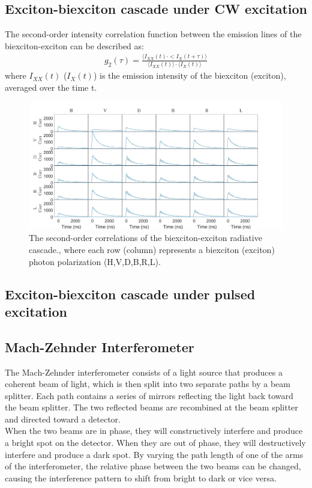 \subsection{Exciton-biexciton cascade under CW excitation}
The second-order intensity correlation function between the emission lines of the biexciton-exciton can be described as:
\begin{equation} \label{second_order_correlations}
\begin{aligned} 
        g_2(\tau) = \frac{\langle I_{XX}(t) \cdot<I_{X}(t+\tau) \rangle}{\langle I_{XX}(t)\rangle \cdot\langle I_{X}(t)\rangle}
\end{aligned}
\end{equation}
where $I_{XX}(t)$ ($I_X(t)$) is the emission intensity of the biexciton (exciton), averaged over the time t.
\begin{figure}[H]
	\centering
	\includegraphics[scale=0.24]{figures/XX_X_Correlations.jpg}
	\caption{ The second-order correlations of the biexciton-exciton radiative cascade., where each row (column) represents a biexciton (exciton) photon polarization (H,V,D,B,R,L).}
	\label{fig:XX_X_Correlations}
\end{figure}
\subsection{Exciton-biexciton cascade under pulsed excitation}
\subsection{Mach-Zehnder Interferometer}
The Mach-Zehnder interferometer consists of a light source that produces a coherent beam of light, which is then split into two separate paths by a beam splitter. Each path contains a series of mirrors reflecting the light back toward the beam splitter. The two reflected beams are recombined at the beam splitter and directed toward a detector.\\
When the two beams are in phase, they will constructively interfere and produce a bright spot on the detector. When they are out of phase, they will destructively interfere and produce a dark spot. By varying the path length of one of the arms of the interferometer, the relative phase between the two beams can be changed, causing the interference pattern to shift from bright to dark or vice versa.
